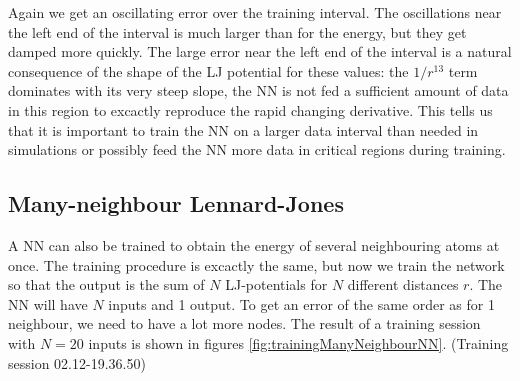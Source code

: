 \documentclass[twoside,english]{uiofysmaster}
\begin{document}
Again we get an oscillating error over the training interval. The oscillations near the left end of the interval is much larger
than for the energy, but they get damped more quickly. The large error near the left end of the interval is a natural
consequence of the shape of the LJ potential for these values: the $1/r^{13}$ term dominates with its very steep slope, the NN is not 
fed a sufficient amount of data in this region to excactly reproduce the rapid changing derivative. 
This tells us that it is important to train the NN on a larger data interval than needed in simulations or possibly
feed the NN more data in critical regions during training. 

\subsection{Many-neighbour Lennard-Jones}
A NN can also be trained to obtain the energy of several neighbouring atoms at once. 
The training procedure is excactly the same, but now we train the network so that the output
is the sum of $N$ LJ-potentials for $N$ different distances $r$. The NN will have $N$ inputs and 1 output. 
To get an error of the same order as for 1 neighbour, we need to have a lot more nodes. The result of a training
session with $N=20$ inputs is shown in figures \autoref{fig:trainingManyNeighbourNN}. 
(Training session 02.12-19.36.50)
\end{document}
